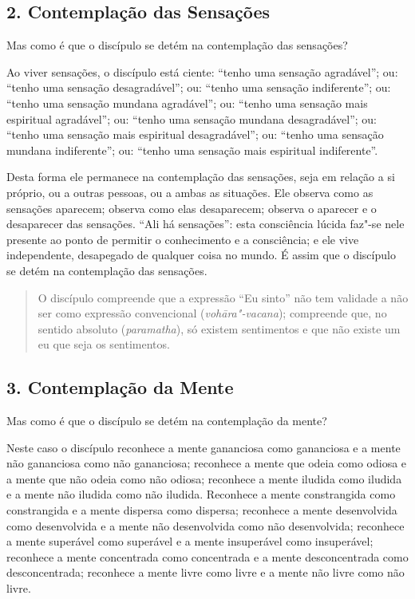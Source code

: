 \subsection{2. Contemplação das Sensações}


Mas como é que o discípulo se detém na contemplação das sensações?

Ao viver sensações, o discípulo está ciente: “tenho uma sensação agradável”;
ou: “tenho uma sensação desagradável”; ou: “tenho uma sensação indiferente”;
ou: “tenho uma sensação mundana agradável”; ou: “tenho uma sensação mais
espiritual agradável”; ou: “tenho uma sensação mundana desagradável”; ou:
“tenho uma sensação mais espiritual desagradável”; ou: “tenho uma sensação
mundana indiferente”; ou: “tenho uma sensação mais espiritual indiferente”.

Desta forma ele permanece na contemplação das sensações, seja em relação a si
próprio, ou a outras pessoas, ou a ambas as situações. Ele observa como as
sensações aparecem; observa como elas desaparecem; observa o aparecer e o
desaparecer das sensações. “Ali há sensações”: esta consciência lúcida faz"-se
nele presente ao ponto de permitir o conhecimento e a consciência; e ele vive
independente, desapegado de qualquer coisa no mundo. É assim que o discípulo se
detém na contemplação das sensações.


\begin{quote}
  O discípulo compreende que a expressão “Eu sinto” não tem validade a não ser
  como expressão convencional (\emph{vohāra"-vacana}); compreende que, no sentido
  absoluto (\emph{paramatha}), só existem sentimentos e que não existe um eu
  que seja os sentimentos.
\end{quote}

\subsection{3. Contemplação da Mente}


Mas como é que o discípulo se detém na contemplação da mente?

Neste caso o discípulo reconhece a mente gananciosa como gananciosa e a mente
não gananciosa como não gananciosa; reconhece a mente que odeia como odiosa e a
mente que não odeia como não odiosa; reconhece a mente iludida como iludida e a
mente não iludida como não iludida. Reconhece a mente constrangida como
constrangida e a mente dispersa como dispersa; reconhece a mente desenvolvida
como desenvolvida e a mente não desenvolvida como não desenvolvida; reconhece a
mente superável como superável e a mente insuperável como insuperável; reconhece
a mente concentrada como concentrada e a mente desconcentrada como desconcentrada;
reconhece a mente livre como livre e a mente não livre como não livre.

